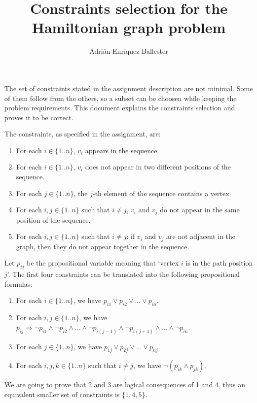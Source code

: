 \documentclass{article}
\title{Constraints selection for the Hamiltonian graph problem}
\author{Adrián Enríquez Ballester}
\begin{document}
\maketitle

The set of constraints stated in the assignment description are not minimal.
Some of them follow from the others, so a subset can be choosen while keeping the
problem requirements. This document explains the constraints selection and
proves it to be correct.

The constraints, as specified in the assignment, are:

\begin{enumerate}
  \item For each $i \in \{1..n\}$, $v_i$ appears in the sequence.
  \item For each $i \in \{1..n\}$, $v_i$ does not appear in two different
    positions of the sequence.
  \item For each $j \in \{1..n\}$, the $j$-th element of the sequence contains
    a vertex.
  \item For each $i,j \in \{1..n\}$ such that $i \neq j$, $v_i$ and $v_j$ do
    not appear in the same position of the sequence.
  \item For each $i,j \in \{1..n\}$ such that $i \neq j$: if $v_i$ and $v_j$
    are not adjacent in the graph, then they do not appear together in the sequence.
\end{enumerate}

Let $p_{i j}$ be the propositional variable meaning that `vertex $i$ is in the
path position $j$'. The first four constraints can be translated into the following
propositional formulas:

\begin{enumerate}
  \item For each $i \in \{1..n\}$, we have $p_{i 1} \lor p_{i 2} \lor ... \lor
    p_{i n}$.
  \item For each $i,j \in \{1..n\}$, we have $p_{i j} \Rightarrow \neg p_{i 1}
    \land \neg p_{i 2} \land ... \land \neg p_{i (j - 1)} \land \neg p_{i (j
    + 1)} \land ... \land \neg p_{i n}$.
  \item For each $j \in \{1..n\}$, we have $p_{1 j} \lor p_{2 j} \lor ... \lor
    p_{n j}$.
  \item For each $i,j,k \in \{1..n\}$ such that $i \neq j$, we have $\neg (p_{i k}
    \land p_{j k})$.
\end{enumerate}

We are going to prove that 2 and 3 are logical consequences of 1 and 4, thus an
equivalent smaller set of constraints is $\{1,4,5\}$.
\end{document}
